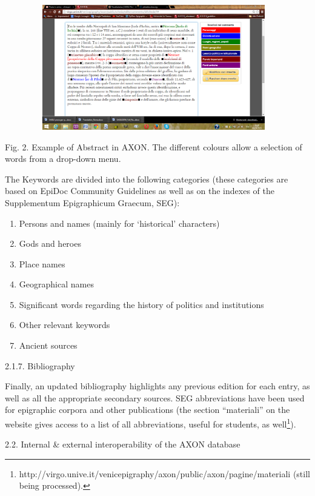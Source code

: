 \documentclass[amsthm,ebook]{saparticle}
\begin{document}
\begin{figure}
\centering
\includegraphics[width=10.88cm,height=5.449cm]{EAGLE2016FullPaperrevised-img002.png}
\end{figure}
Fig. 2. Example of Abstract in AXON. The different colours allow a selection of words from a drop-down menu. 


\bigskip

The Keywords are divided into the following categories (these categories are based on EpiDoc Community Guidelines as
well as on the indexes of the Supplementum Epigraphicum Graecum, SEG):

\begin{enumerate}
\item Persons and names (mainly for ‘historical’ characters)
\item Gods and heroes
\item Place names
\item Geographical names
\item Significant words regarding the history of politics and institutions
\item Other relevant keywords
\item Ancient sources
\end{enumerate}

\bigskip

2.1.7. Bibliography

Finally, an updated bibliography highlights any previous edition for each entry, as well as all the appropriate
secondary sources. SEG abbreviations have been used for epigraphic corpora and other publications (the section
“materiali” on the website gives access to a list of all abbreviations, useful for students, as well\footnote{
http://virgo.unive.it/venicepigraphy/axon/public/axon/pagine/materiali (still being processed).}).


\bigskip

2.2. Internal \& external interoperability of the AXON database
\end{document}
